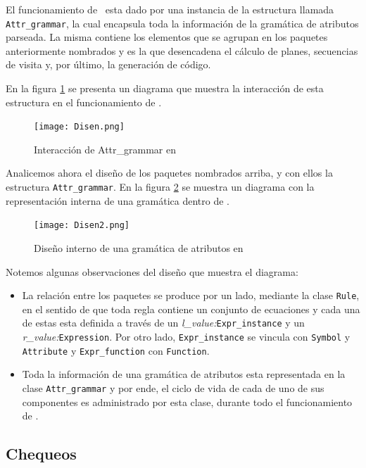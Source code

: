 El funcionamiento de \maggen\ esta dado por una instancia de la estructura llamada \texttt{Attr\_grammar}, la cual encapsula toda la información de la gramática de atributos parseada. La misma contiene los elementos que se agrupan en los paquetes anteriormente nombrados y es la que desencadena el cálculo de planes, secuencias de visita y, por último, la generación de código. 
 
En la figura \ref{fig:disen} se presenta un diagrama que muestra la interacción de esta estructura en el funcionamiento de \maggen.

\begin{figure}[h!]\centering
\texttt{[image: Disen.png]}
\caption{\label{fig:disen}Interacción de Attr\_grammar en \maggen}
\end{figure}

Analicemos ahora el diseño de los paquetes nombrados arriba, y con ellos la estructura \texttt{Attr\_grammar}.  En la figura \ref{fig:disen2} se muestra un diagrama con la representación interna de una gramática dentro de \maggen.

\begin{figure}[h!]\centering
\texttt{[image: Disen2.png]}
\caption{\label{fig:disen2}Diseño interno de una gramática de atributos en \maggen}
\end{figure}

Notemos algunas observaciones del diseño que muestra el diagrama:

\begin{itemize}
\item La relación entre los paquetes se produce por un lado, mediante la clase \texttt{Rule}, en el sentido de que toda regla contiene un conjunto de ecuaciones y cada una de estas esta definida a través de un \textit{l\_value:}\texttt{Expr\_instance} y un \textit{r\_value:}\texttt{Expression}. Por otro lado, \texttt{Expr\_instance} se vincula con \texttt{Symbol} y \texttt{Attribute} y \texttt{Expr\_function} con \texttt{Function}.

\item Toda la información de una gramática de atributos esta representada en la clase \texttt{Attr\_grammar} y por ende, el ciclo de vida de cada de uno de sus componentes es administrado por esta clase, durante todo el funcionamiento de \maggen. 
\end{itemize}

\subsection*{Chequeos}
\label{subsec:check}

